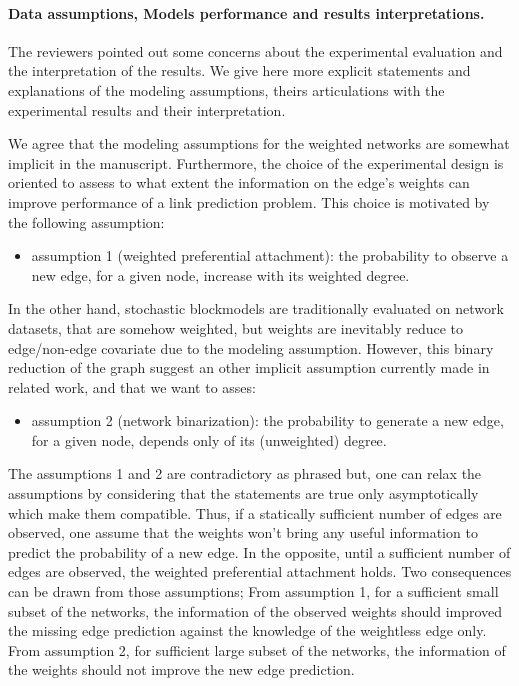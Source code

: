 \documentclass{article}
\begin{document}
\paragraph{Data assumptions, Models performance and results interpretations.}


The reviewers pointed out some concerns about the experimental evaluation and the interpretation of the results. We give here more explicit statements and explanations of the modeling assumptions, theirs articulations with the experimental results and their interpretation.

We agree that the modeling assumptions for the weighted networks are somewhat implicit in the manuscript. Furthermore, the choice of the experimental design is oriented to assess to what extent the information on the edge's weights can improve performance of a link prediction problem. This choice is motivated by the following assumption:
\begin{itemize}
\item assumption 1 (weighted preferential attachment): the probability to observe a new edge, for a given node, increase with its weighted degree. 
\end{itemize}

In the other hand, stochastic blockmodels are traditionally evaluated on network datasets, that are somehow weighted, but weights are inevitably reduce to edge/non-edge covariate due to the modeling assumption. However, this binary reduction of the graph suggest an other implicit assumption currently made in related work, and that we want to asses:
\begin{itemize}
\item assumption 2 (network binarization): the probability to generate a new edge, for a given node, depends only of its (unweighted) degree.
\end{itemize}

The assumptions 1 and 2 are contradictory as phrased but, one can relax the assumptions by considering that the statements are true only asymptotically which make them compatible. Thus, if a statically sufficient number of edges are observed, one assume that the weights won't bring any useful information to predict the probability of a new edge. In the opposite, until a sufficient number of edges are observed, the weighted preferential attachment holds. Two consequences can be drawn from those assumptions; From assumption 1, for a sufficient small subset of the networks, the information of the observed weights should improved the missing edge prediction against the knowledge of the weightless edge only. From assumption 2, for sufficient large subset of the networks, the information of the weights should not improve the new edge prediction.
\end{document}
